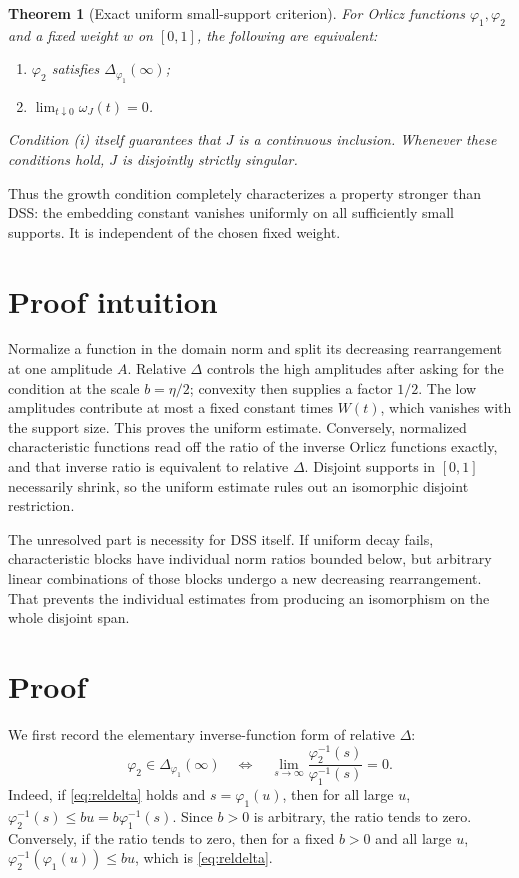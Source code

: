 \documentclass[11pt]{article}
\newtheorem{theorem}{Theorem}
\begin{document}
\begin{theorem}[Exact uniform small-support criterion]\label{thm:main}
For Orlicz functions $\varphi_1,\varphi_2$ and a fixed weight $w$ on $[0,1]$,
the following are equivalent:
\begin{enumerate}[label=\textup{(\roman*)}]
\item $\varphi_2$ satisfies $\Delta_{\varphi_1}(\infty)$;
\item $\displaystyle\lim_{t\downarrow0}\omega_J(t)=0$.
\end{enumerate}
Condition \textup{(i)} itself guarantees that $J$ is a continuous inclusion.
Whenever these conditions hold, $J$ is disjointly strictly singular.
\end{theorem}

Thus the growth condition completely characterizes a property stronger than
DSS: the embedding constant vanishes uniformly on all sufficiently small
supports.  It is independent of the chosen fixed weight.

\section{Proof intuition}

Normalize a function in the domain norm and split its decreasing
rearrangement at one amplitude $A$.  Relative $\Delta$ controls the high
amplitudes after asking for the condition at the scale $b=\eta/2$; convexity
then supplies a factor $1/2$.  The low amplitudes contribute at most a fixed
constant times $W(t)$, which vanishes with the support size.  This proves the
uniform estimate.  Conversely, normalized characteristic functions read off
the ratio of the inverse Orlicz functions exactly, and that inverse ratio is
equivalent to relative $\Delta$.  Disjoint supports in $[0,1]$ necessarily
shrink, so the uniform estimate rules out an isomorphic disjoint restriction.

The unresolved part is necessity for DSS itself.  If uniform decay fails,
characteristic blocks have individual norm ratios bounded below, but arbitrary
linear combinations of those blocks undergo a new decreasing rearrangement.
That prevents the individual estimates from producing an isomorphism on the
whole disjoint span.

\section{Proof}

We first record the elementary inverse-function form of relative $\Delta$:
\begin{equation}\label{eq:inverse}
 \varphi_2\in\Delta_{\varphi_1}(\infty)
 \quad\Longleftrightarrow\quad
 \lim_{s\to\infty}
 \frac{\varphi_2^{-1}(s)}{\varphi_1^{-1}(s)}=0.
\end{equation}
Indeed, if \eqref{eq:reldelta} holds and $s=\varphi_1(u)$, then for all large
$u$,
$\varphi_2^{-1}(s)\leq bu=b\varphi_1^{-1}(s)$.  Since $b>0$ is arbitrary,
the ratio tends to zero.  Conversely, if the ratio tends to zero, then for a
fixed $b>0$ and all large $u$,
$\varphi_2^{-1}(\varphi_1(u))\leq bu$, which is \eqref{eq:reldelta}.
\end{document}
